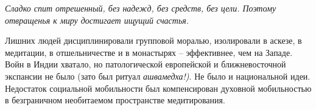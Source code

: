 \documentclass[a4paper]{article}
\begin{document}
{\itshape
Сладко спит отрешенный, без надежд, без средств, без цели. Поэтому отвращенья к миру достигает ищущий счастья.}

{
Лишних людей дисциплинировали групповой моралью, изолировали в аскезе, в медитации, в отшельничестве и в монастырях –
эффективнее, чем на Западе. Войн в Индии хватало, но патологической европейской и ближневосточной экспансии не было
(зато был ритуал \textit{ашвамедха!)}. Не было и национальной идеи. Недостаток социальной мобильности был компенсирован
духовной мобильностью в безграничном необитаемом пространстве медитирования. }
\end{document}
